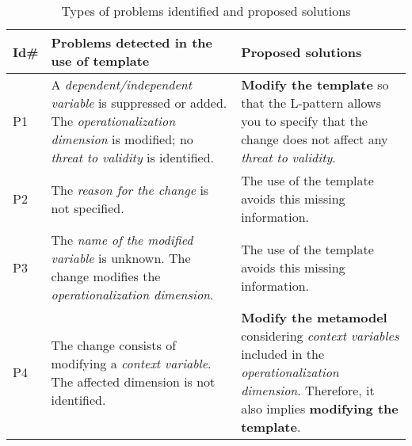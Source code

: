 
\begin{table}
\caption{Types of problems identified and proposed solutions}
\label{tab:tipos}

\begin{tabular}{| l |p{5cm} |p{6cm} |}

\hline
\textbf{Id\#} & \textbf{Problems detected in the use of template} & \textbf{Proposed solutions
} \\
\hline
P1 & A \emph{dependent/independent variable} is suppressed or added. The \emph{operationalization dimension} is modified; no \emph{threat to validity} is identified. &  \textbf{Modify the template} so that the L-pattern allows you to specify that the change does not affect any \emph{threat to validity}. \\ \hline



P2 & The  \emph{reason for the change}  is not specified.  & The use of the template avoids this missing information. \\ \hline
P3 & The  \emph{name of the modified variable} is unknown. The change modifies the  \emph{operationalization dimension}.  & The use of the template avoids this missing information. \\ \hline

P4 & The change consists of modifying a \emph{context variable}. The affected dimension is not identified.  & \textbf{Modify the metamodel} considering \emph{context variables} included in the \emph{operationalization dimension}. Therefore, it also implies \textbf{modifying the template}. \\ \hline


\end{tabular}


\end{table}




